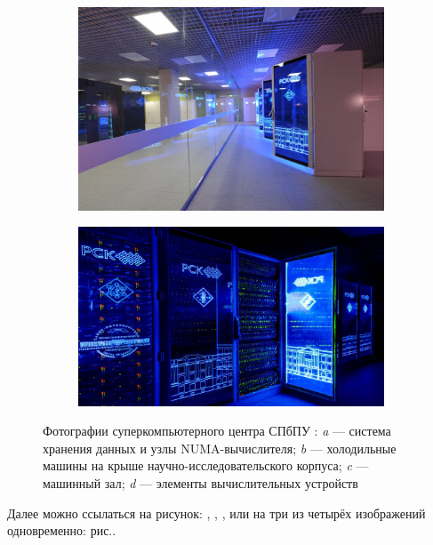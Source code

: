\begin{figure}[ht]
\begin{subfigure}[t]{\dimexpr.5\linewidth-1.3em\relax}
	\includegraphics[width=.95\linewidth,valign=t]{my_folder/images/spbpu_sc_hall}
\end{subfigure}%
\hfill %
%
\begin{subfigure}[t]{\dimexpr.5\linewidth-1.3em\relax}
	\centering
	\includegraphics[width=.95\linewidth,valign=t]{my_folder/images/spbpu_sc_box}
\end{subfigure}
\captionsetup{justification=centering} %
\caption{Фотографии суперкомпьютерного центра СПбПУ \cite{spbpu-gallery}: {\itshape a} --- система хранения данных и узлы NUMA-вычислителя; {\itshape b} --- холодильные машины на крыше научно-исследовательского корпуса; {\itshape c} --- машинный зал; {\itshape d} --- элементы вычислительных устройств} 
\label{fig:spbpu_sc-four-photos}
\end{figure}

Далее можно ссылаться на рисунок: , , ,  или на три из четырёх изображений одновременно: рис..